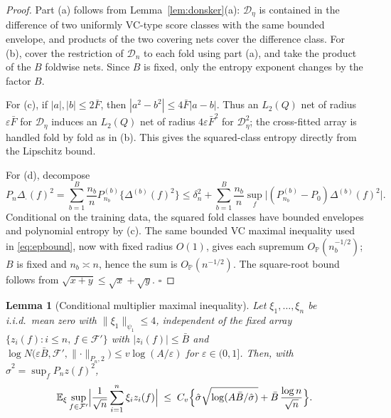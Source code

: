 \documentclass[11pt]{article}
\newtheorem{lemma}{Lemma}
\newcommand{\E}{\mathbb E}
\newcommand{\Pp}{\mathbb P}
\newcommand{\Op}{O_{\Pp}}
\newcommand{\calD}{\mathcal D}
\newcommand{\calF}{\mathcal F}
\newcommand{\eps}{\varepsilon}
\newcommand{\norm}[1]{\lVert #1\rVert}
\begin{document}
\begin{proof}
Part (a) follows from Lemma~\ref{lem:donsker}\textup{(a)}: $\calD_\eta$ is contained in the difference of two uniformly VC-type score classes with the same bounded envelope, and products of the two covering nets cover the difference class. For (b), cover the restriction of $\calD_n$ to each fold using part (a), and take the product of the $B$ foldwise nets. Since $B$ is fixed, only the entropy exponent changes by the factor $B$.

For (c), if $|a|,|b|\le 2\bar F$, then $|a^2-b^2|\le4\bar F|a-b|$. Thus an $L_2(Q)$ net of radius $\eps\bar F$ for $\calD_\eta$ induces an $L_2(Q)$ net of radius $4\eps\bar F^2$ for $\calD_\eta^2$; the cross-fitted array is handled fold by fold as in (b). This gives the squared-class entropy directly from the Lipschitz bound.

For (d), decompose
\[
P_n\Delta_\cdot(f)^2
=\sum_{b=1}^B\frac{n_b}{n}P^{(b)}_{n_b}\{\Delta^{(b)}(f)^2\}
\le \delta_n^2+\sum_{b=1}^B\frac{n_b}{n}\sup_f\bigl|(P^{(b)}_{n_b}-P_0)\Delta^{(b)}(f)^2\bigr|.
\]
Conditional on the training data, the squared fold classes have bounded envelopes and polynomial entropy by (c). The same bounded VC maximal inequality used in \eqref{eq:epbound}, now with fixed radius $O(1)$, gives each supremum $\Op(n_b^{-1/2})$; $B$ is fixed and $n_b\asymp n$, hence the sum is $\Op(n^{-1/2})$. The square-root bound follows from $\sqrt{x+y}\le\sqrt x+\sqrt y$. \hfill$\square$
\end{proof}

\begin{lemma}[Conditional multiplier maximal inequality]\label{lem:multmax}
Let $\xi_1,\dots,\xi_n$ be i.i.d.\ mean zero with $\norm{\xi_1}_{\psi_1}\le4$, independent of the fixed array $\{z_i(f):i\le n,\,f\in\calF'\}$ with $|z_i(f)|\le\bar B$ and
$\log N\bigl(\eps\bar B,\calF',\norm{\cdot}_{P_n,2}\bigr)\le v\log(A/\eps)$ for $\eps\in(0,1]$. Then, with $\hat\sigma^2=\sup_fP_nz(f)^2$,
\begin{equation*}
\E_\xi\sup_{f\in\calF'}\Bigl|\frac1{\sqrt n}\sum_{i=1}^n\xi_i z_i(f)\Bigr|
\;\le\;C_v\Bigl\{\hat\sigma\sqrt{\log(A\bar B/\hat\sigma)}+\bar B\,\frac{\log n}{\sqrt n}\Bigr\}.
\end{equation*}
\end{lemma}
\end{document}
